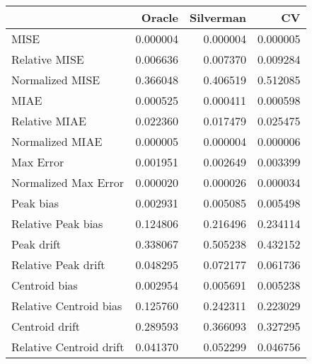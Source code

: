 \begin{tabular}{lrrr}
  \hline
 & Oracle & Silverman & CV \\ 
  \hline
MISE & 0.000004 & 0.000004 & 0.000005 \\ 
  Relative MISE & 0.006636 & 0.007370 & 0.009284 \\ 
  Normalized MISE & 0.366048 & 0.406519 & 0.512085 \\ 
  MIAE & 0.000525 & 0.000411 & 0.000598 \\ 
  Relative MIAE & 0.022360 & 0.017479 & 0.025475 \\ 
  Normalized MIAE & 0.000005 & 0.000004 & 0.000006 \\ 
  Max Error & 0.001951 & 0.002649 & 0.003399 \\ 
  Normalized Max Error & 0.000020 & 0.000026 & 0.000034 \\ 
  Peak bias & 0.002931 & 0.005085 & 0.005498 \\ 
  Relative Peak bias & 0.124806 & 0.216496 & 0.234114 \\ 
  Peak drift & 0.338067 & 0.505238 & 0.432152 \\ 
  Relative Peak drift & 0.048295 & 0.072177 & 0.061736 \\ 
  Centroid bias & 0.002954 & 0.005691 & 0.005238 \\ 
  Relative Centroid bias & 0.125760 & 0.242311 & 0.223029 \\ 
  Centroid drift & 0.289593 & 0.366093 & 0.327295 \\ 
  Relative Centroid drift & 0.041370 & 0.052299 & 0.046756 \\ 
   \hline
\end{tabular}
